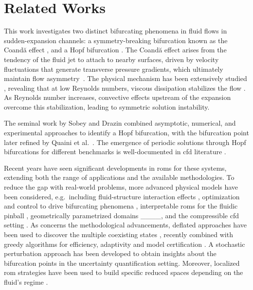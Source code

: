 \section{Related Works}
\label{sec:related}

This work investigates two distinct bifurcating phenomena in fluid flows in sudden-expansion channels: a symmetry-breaking bifurcation known as the Coandă effect \parencite{PichiDrivingBifurcatingParametrized2022a,Khamlich_2022,Pitton_2017}, and a Hopf bifurcation \parencite{QUAINI,Fortin_localization}. %
%
%
The Coandă effect arises from the tendency of the fluid jet to attach to nearby surfaces, driven by velocity fluctuations that generate transverse pressure gradients, which ultimately maintain flow asymmetry~\parencite{tritton1977physical, wille1965coanda}. The physical mechanism has been extensively studied \parencite{Cherdron_Durst_Whitelaw_1978, Sobey_Drazin_1986}, revealing that at low Reynolds numbers, viscous dissipation stabilizes the flow \parencite{HAWA_RUSAK_2001}. As Reynolds number increases, convective effects upstream of the expansion overcome this stabilization, leading to symmetric solution instability.

The seminal work by Sobey and Drazin \parencite{Sobey_Drazin_1986} combined asymptotic, numerical, and experimental approaches to identify a Hopf bifurcation, with the bifurcation point later refined by Quaini et al.\ \parencite{QUAINI}. The emergence of periodic solutions through Hopf bifurcations for different benchmarks is well-documented in \gls{cfd} literature \parencite{Sobey_Drazin_1986, Fortin_localization, ArioliKoch2021, Dušek_Gal_Fraunié_1994}.

%

Recent years have seen significant developments in \glspl{rom} for these systems, extending both the range of applications and the available methodologies. To reduce the gap with real-world problems, more advanced physical models have been considered, e.g.\ including fluid-structure interaction effects \parencite{Khamlich_2022}, optimization and control to drive bifurcating phenomena \parencite{PichiDrivingBifurcatingParametrized2022a,Boull2023}, interpretable \glspl{rom} for the fluidic pinball \parencite{Pastur_2019}, geometrically parametrized domains ____, and the compressible \gls{cfd} setting \parencite{Tonicello_2024}. As concerns the methodological advancements,  deflated approaches have been used to discover the multiple coexisting states \parencite{pintore_2021}, recently combined with greedy algorithms for efficiency, adaptivity and model certification \parencite{pichi2025deflationbasedcertifiedgreedyalgorithm}. A stochastic perturbation approach \parencite{gonnella2025stochasticperturbationapproachnonlinear} has been developed to obtain insights about the bifurcation points in the uncertainty quantification setting. Moreover, localized \gls{rom} strategies have been used to build specific reduced spaces depending on the fluid's regime \parencite{Hess_2019}.

